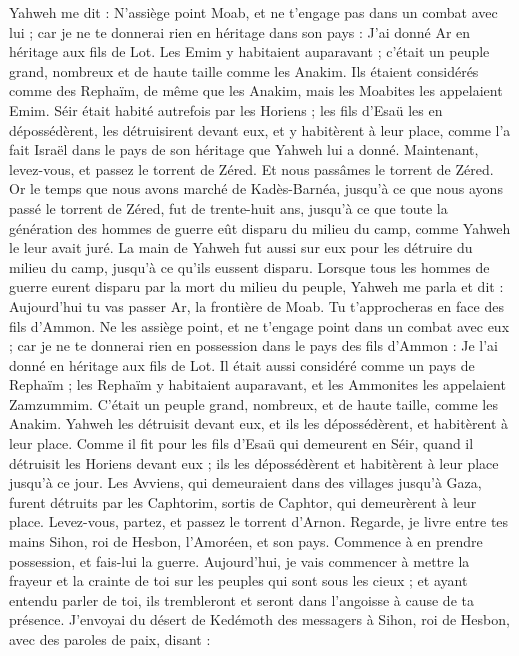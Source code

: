 \begin{multicols}{2}
Yahweh me dit : N’assiège point Moab, et ne t’engage pas dans un combat avec lui ; car je ne te donnerai rien en héritage dans son pays : J'ai donné Ar en héritage aux fils de Lot.
Les Emim y habitaient auparavant ; c'était un peuple grand, nombreux et de haute taille comme les Anakim.
Ils étaient considérés comme des Rephaïm, de même que les Anakim, mais les Moabites les appelaient Emim.
Séir était habité autrefois par les Horiens ; les fils d'Esaü les en dépossédèrent, les détruisirent devant eux, et y habitèrent à leur place, comme l’a fait Israël dans le pays de son héritage que Yahweh lui a donné.
Maintenant, levez-vous, et passez le torrent de Zéred. Et nous passâmes le torrent de Zéred.
Or le temps que nous avons marché de Kadès-Barnéa, jusqu'à ce que nous ayons passé le torrent de Zéred, fut de trente-huit ans, jusqu'à ce que toute la génération des hommes de guerre eût disparu du milieu du camp, comme Yahweh le leur avait juré.
La main de Yahweh fut aussi sur eux pour les détruire du milieu du camp, jusqu'à ce qu'ils eussent disparu.
Lorsque tous les hommes de guerre eurent disparu par la mort du milieu du peuple,
Yahweh me parla et dit :
Aujourd'hui tu vas passer Ar, la frontière de Moab.
Tu t’approcheras en face des fils d’Ammon. Ne les assiège point, et ne t’engage point dans un combat avec eux ; car je ne te donnerai rien en possession dans le pays des fils d’Ammon : Je l'ai donné en héritage aux fils de Lot.
Il était aussi considéré comme un pays de Rephaïm ; les Rephaïm y habitaient auparavant, et les Ammonites les appelaient Zamzummim.
C’était un peuple grand, nombreux, et de haute taille, comme les Anakim. Yahweh les détruisit devant eux, et ils les dépossédèrent, et habitèrent à leur place.
Comme il fit pour les fils d'Esaü qui demeurent en Séir, quand il détruisit les Horiens devant eux ; ils les dépossédèrent et habitèrent à leur place jusqu'à ce jour.
Les Avviens, qui demeuraient dans des villages jusqu'à Gaza, furent détruits par les Caphtorim, sortis de Caphtor, qui demeurèrent à leur place.
Levez-vous, partez, et passez le torrent d'Arnon. Regarde, je livre entre tes mains Sihon, roi de Hesbon, l’Amoréen, et son pays. Commence à en prendre possession, et fais-lui la guerre.
Aujourd’hui, je vais commencer à mettre la frayeur et la crainte de toi sur les peuples qui sont sous les cieux ; et ayant entendu parler de toi, ils trembleront et seront dans l’angoisse à cause de ta présence.
J'envoyai du désert de Kedémoth des messagers à Sihon, roi de Hesbon, avec des paroles de paix, disant :

\end{multicols}
